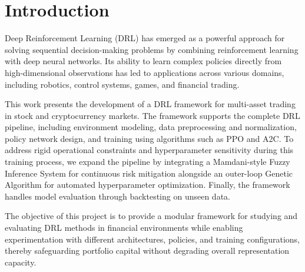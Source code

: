 \section{Introduction}

Deep Reinforcement Learning (DRL) has emerged as a powerful approach for 
solving sequential decision-making problems by combining reinforcement 
learning with deep neural networks. Its ability to learn complex policies 
directly from high-dimensional observations has led to applications across
various domains, including robotics, control systems, games, and financial trading.

This work presents the development of a DRL framework for multi-asset trading in stock 
and cryptocurrency markets. The framework supports the complete DRL pipeline, including 
environment modeling, data preprocessing and normalization, policy network design, and training 
using algorithms such as PPO and A2C. To address rigid operational constraints and hyperparameter 
sensitivity during this training process, we expand the pipeline by integrating a Mamdani-style 
Fuzzy Inference System for continuous risk mitigation alongside an outer-loop Genetic Algorithm for 
automated hyperparameter optimization. Finally, the framework handles model evaluation through 
backtesting on unseen data.

The objective of this project is to provide a modular framework for studying and evaluating 
DRL methods in financial environments while enabling experimentation with different 
architectures, policies, and training configurations, thereby safeguarding portfolio capital 
without degrading overall representation capacity.
